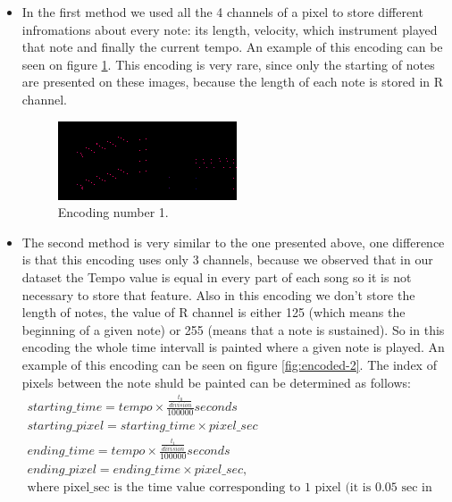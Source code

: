 \documentclass{article}
\begin{document}
\begin{enumerate}
		\begin{itemize}
			\item In the first method we used all the 4 channels of a pixel to store different infromations about every note: its length, velocity, which instrument played that note and finally the current tempo. An example of this encoding can be seen on figure \ref{fig:encoded-1}. This encoding is very rare, since only the starting of notes are presented on these images, because the length of each note is stored in R channel. 
			\begin{figure}[!htb]
				\centering
				\includegraphics[width=\linewidth]{encode1.png}
				\caption{Encoding number 1.}
				\label{fig:encoded-1}
			\end{figure}
			\item The second method is very similar to the one presented above, one difference is that this encoding uses only 3 channels, because we observed that in our dataset the Tempo value is equal in every part of each song so it is not necessary to store that feature. Also in this encoding we don't store the length of notes, the value of R channel is either 125 (which means the beginning of a given note) or 255 (means that a note is sustained). So in this encoding the whole time intervall is painted where a given note is played. An example of this encoding can be seen on figure \ref{fig:encoded-2}. The index of pixels between the note shuld be painted can be determined as follows: 
				\begin{gather}
					starting\_time = tempo\times\frac{\frac{t_0}{division}}{100000} seconds \\ \nonumber
					starting\_pixel = starting\_time \times pixel\_sec \\ \nonumber
					ending\_time = tempo\times\frac{\frac{t_1}{division}}{100000} seconds \\ \nonumber
					ending\_pixel = ending\_time \times pixel\_sec, \\ \nonumber \text{where pixel\_sec is the time value corresponding to 1 pixel (it is 0.05 sec in our encoding)}

\end{gather}
\end{itemize}
\end{enumerate}
\end{document}
